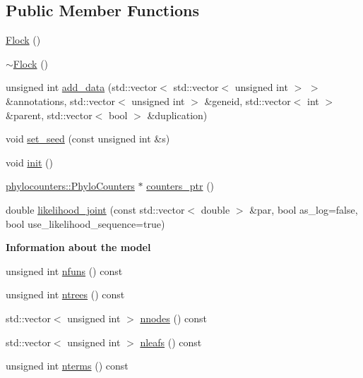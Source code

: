 \subsection*{Public Member Functions}
\begin{DoxyCompactItemize}
\item 
\hyperlink{class_flock_a2a0a514c368e21f718ad7358ed42f3b7}{Flock} ()
\item 
\hyperlink{class_flock_ab5ed0567a8721dd114763267f9fa3bdf}{$\sim$\+Flock} ()
\item 
unsigned int \hyperlink{class_flock_a17f2726d36ca5727b14c71d1e1dbabe9}{add\+\_\+data} (std\+::vector$<$ std\+::vector$<$ unsigned int $>$ $>$ \&annotations, std\+::vector$<$ unsigned int $>$ \&geneid, std\+::vector$<$ int $>$ \&parent, std\+::vector$<$ bool $>$ \&duplication)
\item 
void \hyperlink{class_flock_acfa9efc24a1ff2f0f31206570da51259}{set\+\_\+seed} (const unsigned int \&s)
\item 
void \hyperlink{class_flock_a99f3c0a3aacc8af28c13207dd81d7164}{init} ()
\item 
\hyperlink{namespacebarry_1_1counters_1_1phylo_a4e401ffe66d04091343dcffaf915f8c3}{phylocounters\+::\+Phylo\+Counters} $\ast$ \hyperlink{class_flock_a1e7aec0dc05f41da6f0caa80a202daa0}{counters\+\_\+ptr} ()
\item 
double \hyperlink{class_flock_a701dce27fdc0a20e63caec1e1fd3def7}{likelihood\+\_\+joint} (const std\+::vector$<$ double $>$ \&par, bool as\+\_\+log=false, bool use\+\_\+likelihood\+\_\+sequence=true)
\end{DoxyCompactItemize}
\begin{Indent}\textbf{ Information about the model}\par
\begin{DoxyCompactItemize}
\item 
unsigned int \hyperlink{class_flock_ac20edfc8eced5e6f8918e1530475207a}{nfuns} () const
\item 
unsigned int \hyperlink{class_flock_acc0c7259a4b3e59f858e79c454cfb8f7}{ntrees} () const
\item 
std\+::vector$<$ unsigned int $>$ \hyperlink{class_flock_a6d1da223af2d612e9cc1a4b11073f2ec}{nnodes} () const
\item 
std\+::vector$<$ unsigned int $>$ \hyperlink{class_flock_a056862c4084f7c6381bec705d80c0afb}{nleafs} () const
\item 
unsigned int \hyperlink{class_flock_a06498d9641893889d1387ff6fe70bcea}{nterms} () const
\end{DoxyCompactItemize}
\end{Indent}
